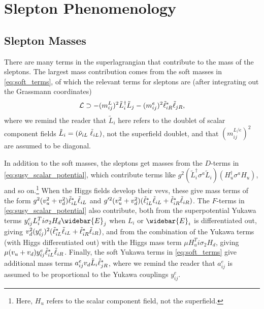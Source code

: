 \section{Slepton Phenomenology}\label{sec:slepton_pheno}

\subsection{Slepton Masses}\label{sec:slepton_masses}

There are many terms in the superlagrangian that contribute to the mass of the sleptons. The largest mass contribution comes from the soft masses in \cref{eq:soft_terms}, of which the relevant terms for sleptons are (after integrating out the Grassmann coordinates)
\begin{equation}
\mathcal{L} \supset -(m_{ij}^L)^2 \tilde{L}_i^\dagger\tilde{L}_j - (m_{ij}^e)^2{\tilde{\ell}}_{iR}^*{\tilde{\ell}}_{jR},
\end{equation}
where we remind the reader that $\tilde{L}_i$ here refers to the doublet of scalar component fields $\tilde{L}_i = (\tilde\nu_{iL}\;{\tilde{\ell}}_{iL})$, not the superfield doublet, and that $(m_{ij}^{L/e})^2$ are assumed to be diagonal.

In addition to the soft masses, the sleptons get masses from the $D$-terms in \cref{eq:susy_scalar_potential}, which contribute terms like $g^2(\tilde{L}_i^\dagger\sigma^a\tilde{L}_i)(H_u^\dagger\sigma^aH_u)$, and so on.\footnote{Here, $H_u$ refers to the scalar component field, not the superfield.}
When the Higgs fields develop their \glspl{vev}, these give mass terms of the form $g^2(v_u^2+v_d^2){\tilde{\ell}}_{iL}^*{\tilde{\ell}}_{iL}$ and $g'^2(v_u^2+v_d^2)({\tilde{\ell}}_{iL}^*{\tilde{\ell}}_{iL}+{\tilde{\ell}}_{iR}^*{\tilde{\ell}}_{iR})$.
The $F$-terms in \cref{eq:susy_scalar_potential} also contribute, both from the superpotential Yukawa terms $y_{ij}^e L_i^T i\sigma_2 H_d \widebar{E}_j$ when $L_i$ or $\widebar{E}_i$ is differentiated out, giving $v_d^2(y_{ij}^e)^2 ({\tilde{\ell}}_{iL}^*{\tilde{\ell}}_{iL} + {\tilde{\ell}}_{iR}^*{\tilde{\ell}}_{iR})$, and from the combination of the Yukawa terms (with Higgs differentiated out) with the Higgs mass term $\mu H_u^T i\sigma_2 H_d$, giving $\mu (v_u+v_d) y_{ij}^e {\tilde{\ell}}_{iL}^*{\tilde{\ell}}_{iR}$.
Finally, the soft Yukawa terms in \cref{eq:soft_terms} give additional mass terms $a_{ij}^e v_d \tilde{L}_i {\tilde{\ell}}_{jR}^*$, where we remind the reader that $a_{ij}^e$ is assumed to be proportional to the Yukawa couplings $y_{ij}^e$.

